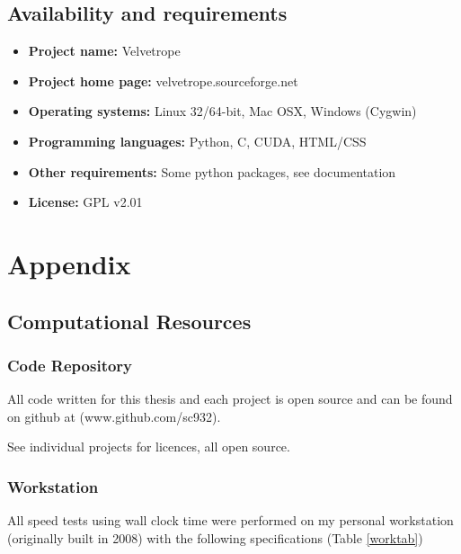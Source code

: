 \documentclass[phd,tocprelim]{cornell}
\begin{document}
\pagebreak

\section{Availability and requirements}
 \begin{itemize}
  \item \textbf{Project name:} Velvetrope
  \item \textbf{Project home page:} velvetrope.sourceforge.net
  \item \textbf{Operating systems:} Linux 32/64-bit, Mac OSX, Windows (Cygwin)
  \item \textbf{Programming languages:} Python, C, CUDA, HTML/CSS
  \item \textbf{Other requirements:} Some python packages, see documentation
  \item \textbf{License:} GPL v2.01
 \end{itemize}



\appendix
\chapter{Appendix}

\section{Computational Resources}

\subsection{Code Repository}

All code written for this thesis and each project is open source and can be found on github at (www.github.com/sc932).

See individual projects for licences, all open source.

\subsection{Workstation}

All speed tests using wall clock time were performed on my personal workstation (originally built in 2008) with the following specifications (Table \ref{worktab})
\end{document}
